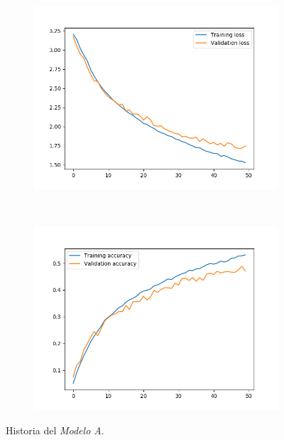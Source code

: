 \documentclass[11pt,a4paper]{article}
\begin{document}
\begin{figure}[H]
  \centering
  \begin{subfigure}{.5\textwidth}
    \centering
    \includegraphics[scale=0.4]{img/deep1-drop-loss-50.png}
    \label{fig:deep1-drop-loss-50}
  \end{subfigure}%
  ~ \quad
  \begin{subfigure}{.5\textwidth}
    \centering
    \includegraphics[scale=0.4]{img/deep1-drop-acc-50.png}
    \label{fig:deep1-drop-acc-50}
  \end{subfigure}
  \caption{Historia del \textit{Modelo A}.}
  \label{fig:history-deep1-drop-50}
\end{figure}
\end{document}
